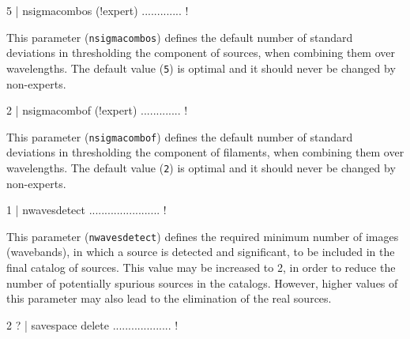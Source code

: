 \documentclass[a4paper,10pt]{article}
\begin{document}
\begin{verbnobox}[\mbox{}\small]
 5                   | nsigmacombos (!expert) ............. !
\end{verbnobox}
This parameter (\verb!nsigmacombos!) defines the default number of standard deviations in thresholding the component of sources,
when combining them over wavelengths. The default value (\verb!5!) is optimal and it should never be changed by non-experts.
\begin{verbnobox}[\mbox{}\small]
 2                   | nsigmacombof (!expert) ............. !
\end{verbnobox}
This parameter (\verb!nsigmacombof!) defines the default number of standard deviations in thresholding the component of filaments,
when combining them over wavelengths. The default value (\verb!2!) is optimal and it should never be changed by non-experts.
\begin{verbnobox}[\mbox{}\small]
 1                   | nwavesdetect ....................... !
\end{verbnobox}
This parameter (\verb!nwavesdetect!) defines the required minimum number of images (wavebands), in which a source is detected and
significant, to be included in the final catalog of sources. This value may be increased to 2, in order to reduce the number of
potentially spurious sources in the catalogs. However, higher values of this parameter may also lead to the elimination of the real
sources.
\begin{verbnobox}[\mbox{}\small]
 2 ?                 | savespace delete ................... !
\end{verbnobox}
\end{document}
